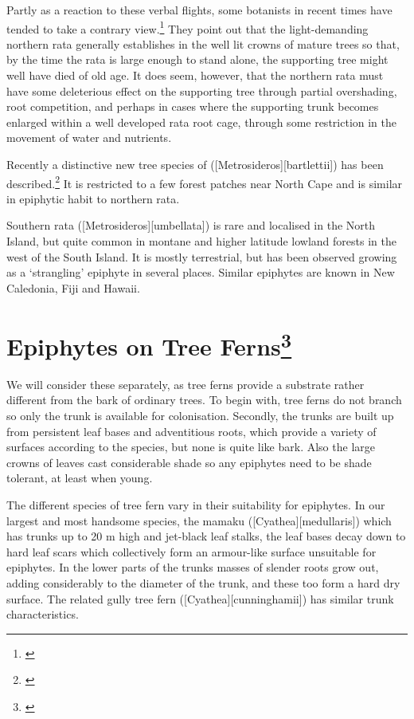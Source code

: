 Partly as a reaction to these verbal flights, some botanists in recent times have tended to take a contrary view.\footnote{\cite{zotov1948rata}}
They point out that the light-demanding northern rata generally establishes in the well lit crowns of mature trees so that, by the time the rata is large enough to stand alone, the supporting tree might well have died of old age.
It does seem, however, that the northern rata must have some deleterious effect on the supporting tree through partial overshading, root competition, and perhaps in cases where the supporting trunk becomes enlarged within a well developed rata root cage, through some restriction in the movement of water and nutrients.

Recently a distinctive new tree species of  ([Metrosideros][bartlettii]) has been described.\footnote{\cite{dawson1985metrosideros}}
It is restricted to a few forest patches near North Cape and is similar in epiphytic habit to northern rata.

Southern rata ([Metrosideros][umbellata]) is rare and localised in the North Island, but quite common in montane and higher latitude lowland forests in the west of the South Island.
It is mostly terrestrial, but has been observed growing as a `strangling' epiphyte in several places.
Similar  epiphytes are known in New Caledonia, Fiji and Hawai{\okina}i.

\section[Epiphytes on Tree Ferns]{Epiphytes on Tree Ferns\footnote{\cite{pope1924role}}}

We will consider these separately, as tree ferns provide a substrate rather different from the bark of ordinary trees.
To begin with, tree ferns do not branch so only the trunk is available for colonisation.
Secondly, the trunks are built up from persistent leaf bases and adventitious roots, which provide a variety of surfaces according to the species, but none is quite like bark.
Also the large crowns of leaves cast considerable shade so any epiphytes need to be shade tolerant, at least when young.

The different species of tree fern vary in their suitability for epiphytes.
In our largest and most handsome species, the mamaku ([Cyathea][medullaris]) which has trunks up to 20 m high and jet-black leaf stalks, the leaf bases decay down to hard leaf scars which collectively form an armour-like surface unsuitable for epiphytes.
In the lower parts of the trunks masses of slender roots grow out, adding considerably to the diameter of the trunk, and these too form a hard dry surface.
The related gully tree fern ([Cyathea][cunninghamii]) has similar trunk characteristics.

